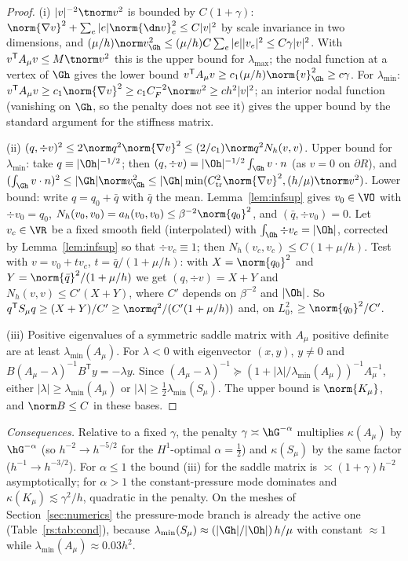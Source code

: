 \begin{proof}
(i) $|v|^{-2}\tnorm v^2$ is bounded by $C(1+\gamma)$: $\norm{\nabla v}^2+\sum_e|e|\norm{\dn v}^2_e\le C|v|^2$ by scale invariance in two dimensions, and $(\mu/h)\norm v^2_{\Gh}\le(\mu/h)C\sum_e|e||v_e|^2\le C\gamma|v|^2$. With $v^{\mathsf T}A_\mu v\le M\tnorm v^2$ this is the upper bound for $\lambda_{\max}$; the nodal function at a vertex of $\Gh$ gives the lower bound $v^{\mathsf T}A_\mu v\ge c_1(\mu/h)\norm{v}^2_{\Gh}\ge c\gamma$. For $\lambda_{\min}$: $v^{\mathsf T}A_\mu v\ge c_1\norm{\nabla v}^2\ge c_1C_F^{-2}\norm v^2\ge ch^2|v|^2$; an interior nodal function (vanishing on $\Gh$, so the penalty does not see it) gives the upper bound by the standard argument for the stiffness matrix.

(ii) $(q,\div v)^2\le2\norm q^2\norm{\nabla v}^2\le(2/c_1)\norm q^2N_h(v,v)$. Upper bound for $\lambda_{\min}$: take $q\equiv|\Oh|^{-1/2}$; then $(q,\div v)=|\Oh|^{-1/2}\int_{\Gh}v\cdot n$ (as $v=0$ on $\partial R$), and $(\int_{\Gh}v\cdot n)^2\le|\Gh|\norm v^2_{\Gh}\le|\Gh|\min(C_{\mathrm{tr}}^2\norm{\nabla v}^2,(h/\mu)\tnorm v^2)$. Lower bound: write $q=q_0+\bar q$ with $\bar q$ the mean. Lemma~\ref{lem:infsup} gives $v_0\in\VO$ with $\div v_0=q_0$, $N_h(v_0,v_0)=a_h(v_0,v_0)\le\beta^{-2}\norm{q_0}^2$, and $(\bar q,\div v_0)=0$. Let $v_c\in\VR$ be a fixed smooth field (interpolated) with $\int_{\Oh}\div v_c=|\Oh|$, corrected by Lemma~\ref{lem:infsup} so that $\div v_c\equiv1$; then $N_h(v_c,v_c)\le C(1+\mu/h)$. Test with $v=v_0+tv_c$, $t=\bar q/(1+\mu/h)$: with $X=\norm{q_0}^2$ and $Y=\norm{\bar q}^2/(1+\mu/h)$ we get $(q,\div v)=X+Y$ and $N_h(v,v)\le C'(X+Y)$, where $C'$ depends on $\beta^{-2}$ and $|\Oh|$. So $q^{\mathsf T}S_\mu q\ge(X+Y)/C'\ge\norm q^2/(C'(1+\mu/h))$ and, on $L^2_0$, $\ge\norm{q_0}^2/C'$.

(iii) Positive eigenvalues of a symmetric saddle matrix with $A_\mu$ positive definite are at least $\lambda_{\min}(A_\mu)$. For $\lambda<0$ with eigenvector $(x,y)$, $y\ne0$ and $B(A_\mu-\lambda)^{-1}B^{\mathsf T}y=-\lambda y$. Since $(A_\mu-\lambda)^{-1}\succeq(1+|\lambda|/\lambda_{\min}(A_\mu))^{-1}A_\mu^{-1}$, either $|\lambda|\ge\lambda_{\min}(A_\mu)$ or $|\lambda|\ge\frac12\lambda_{\min}(S_\mu)$. The upper bound is $\norm{K_\mu}$, and $\norm B\le C$ in these bases.
\end{proof}

\emph{Consequences.} Relative to a fixed $\gamma$, the penalty $\gamma\asymp\hG^{-\alpha}$ multiplies $\kappa(A_\mu)$ by $\hG^{-\alpha}$ (so $h^{-2}\to h^{-5/2}$ for the $H^1$-optimal $\alpha=\frac12$) and $\kappa(S_\mu)$ by the same factor ($h^{-1}\to h^{-3/2}$). For $\alpha\le1$ the bound (iii) for the saddle matrix is $\asymp(1+\gamma)h^{-2}$ asymptotically; for $\alpha>1$ the constant-pressure mode dominates and $\kappa(K_\mu)\lesssim\gamma^2/h$, quadratic in the penalty. On the meshes of Section~\ref{sec:numerics} the pressure-mode branch is already the active one (Table~\ref{rs:tab:cond}), because $\lambda_{\min}(S_\mu)\approx(|\Gh|/|\Oh|)\,h/\mu$ with constant $\approx1$ while $\lambda_{\min}(A_\mu)\approx0.03h^2$.

